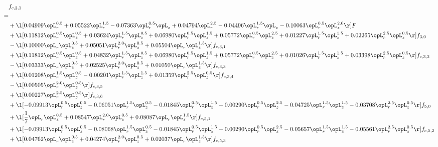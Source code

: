 \begin{alignat}{2} 
\label{eq:f_21_2} 
& f_{c,2,1} \nonumber \\ 
 = \\ 
& + \l[  0.04909 \opL_r^{0.5} +  0.05522 \opL_r^{1.5}   -0.07363 \opL_r^{0.5} \opL_z +  0.04794 \opL_r^{2.5}   -0.04496 \opL_r^{1.5} \opL_z   -0.10063 \opL_r^{0.5} \opL_z^{2.0}  \r] F \nonumber \\ 
& + \l[  0.11812 \opL_r^{0.5} \opL_z^{0.5} +  0.03624 \opL_r^{1.5} \opL_z^{0.5} +  0.06980 \opL_r^{0.5} \opL_z^{1.5} +  0.05772 \opL_r^{0.5} \opL_z^{2.5} +  0.01227 \opL_r^{1.5} \opL_z^{1.5} +  0.02265 \opL_r^{2.5} \opL_z^{0.5}  \r] f_{3,0} \nonumber \\ 
& - \l[  0.10000 \opL_r \opL_z^{0.5} +  0.05051 \opL_r^{2.0} \opL_z^{0.5} +  0.05504 \opL_r \opL_z^{1.5}  \r] f_{c,3,1} \nonumber \\ 
& + \l[  0.11812 \opL_r^{0.5} \opL_z^{0.5} +  0.04832 \opL_r^{1.5} \opL_z^{0.5} +  0.06980 \opL_r^{0.5} \opL_z^{1.5} +  0.05772 \opL_r^{0.5} \opL_z^{2.5} +  0.01026 \opL_r^{1.5} \opL_z^{1.5} +  0.03398 \opL_r^{2.5} \opL_z^{0.5}  \r] f_{c,3,2} \nonumber \\ 
& - \l[  0.03333 \opL_r \opL_z^{0.5} +  0.02525 \opL_r^{2.0} \opL_z^{0.5} +  0.01050 \opL_r \opL_z^{1.5}  \r] f_{c,3,3} \nonumber \\ 
& + \l[  0.01208 \opL_r^{1.5} \opL_z^{0.5}   -0.00201 \opL_r^{1.5} \opL_z^{1.5} +  0.01359 \opL_r^{2.5} \opL_z^{0.5}  \r] f_{c,3,4} \nonumber \\ 
& - \l[  0.00505 \opL_r^{2.0} \opL_z^{0.5}  \r] f_{c,3,5} \nonumber \\ 
& + \l[  0.00227 \opL_r^{2.5} \opL_z^{0.5}  \r] f_{c,3,6} \nonumber \\ 
& + \l[  -0.09913 \opL_r^{0.5} \opL_z^{0.5}   -0.06051 \opL_r^{1.5} \opL_z^{0.5}   -0.01845 \opL_r^{0.5} \opL_z^{1.5} +  0.00290 \opL_r^{0.5} \opL_z^{2.5}   -0.04725 \opL_r^{1.5} \opL_z^{1.5}   -0.03708 \opL_r^{2.5} \opL_z^{0.5}  \r] f_{5,0} \nonumber \\ 
& + \l[ \frac{1}{7} \opL_r \opL_z^{0.5} +  0.08547 \opL_r^{2.0} \opL_z^{0.5} +  0.08087 \opL_r \opL_z^{1.5}  \r] f_{c,5,1} \nonumber \\ 
& + \l[  -0.09913 \opL_r^{0.5} \opL_z^{0.5}   -0.08068 \opL_r^{1.5} \opL_z^{0.5}   -0.01845 \opL_r^{0.5} \opL_z^{1.5} +  0.00290 \opL_r^{0.5} \opL_z^{2.5}   -0.05657 \opL_r^{1.5} \opL_z^{1.5}   -0.05561 \opL_r^{2.5} \opL_z^{0.5}  \r] f_{c,5,2} \nonumber \\ 
& + \l[  0.04762 \opL_r \opL_z^{0.5} +  0.04274 \opL_r^{2.0} \opL_z^{0.5} +  0.02037 \opL_r \opL_z^{1.5}  \r] f_{c,5,3} \nonumber \\ 

\end{alignat}
